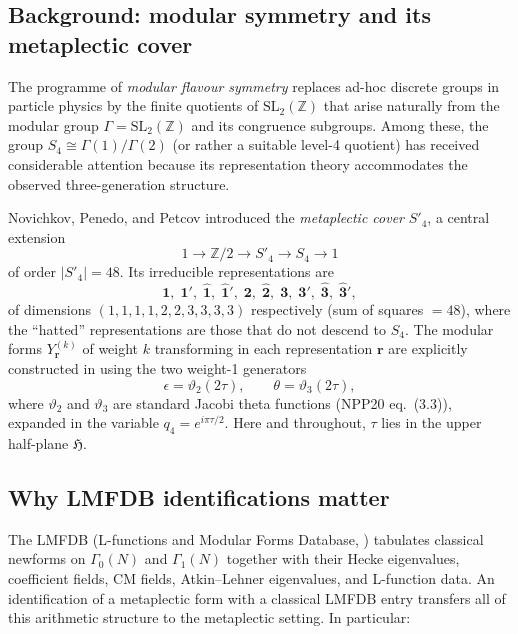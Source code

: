 \documentclass[12pt]{amsart}
\theoremstyle{definition}
\newcommand{\Z}{\mathbb{Z}}
\newcommand{\SL}{\mathrm{SL}}
\newcommand{\Gam}{\Gamma}
\newcommand{\hhat}[1]{\widehat{\mathbf{#1}}}  %
\begin{document}
\subsection{Background: modular symmetry and its metaplectic cover}

The programme of \emph{modular flavour symmetry} replaces ad-hoc discrete
groups in particle physics by the finite quotients of $\SL_2(\Z)$ that
arise naturally from the modular group $\Gamma = \SL_2(\Z)$ and its
congruence subgroups.  Among these, the group $S_4 \cong \Gam(1)/\Gam(2)$
(or rather a suitable level-4 quotient) has received considerable attention
because its representation theory accommodates the observed three-generation
structure.

Novichkov, Penedo, and Petcov \cite{NPP20} introduced the
\emph{metaplectic cover} $S'_4$, a central extension
\[
  1 \to \Z/2 \to S'_4 \to S_4 \to 1
\]
of order $|S'_4| = 48$.  Its irreducible representations are
\[
  \mathbf{1},\; \mathbf{1}',\; \hhat{1},\; \hhat{1}',\;
  \mathbf{2},\; \hhat{2},\; \mathbf{3},\; \mathbf{3}',\; \hhat{3},\;
  \hhat{3}',
\]
of dimensions $(1,1,1,1,2,2,3,3,3,3)$ respectively (sum of squares $= 48$),
where the ``hatted'' representations are those that do not descend
to $S_4$.  The modular forms $Y_{\mathbf{r}}^{(k)}$ of weight $k$
transforming in each representation $\mathbf{r}$ are explicitly
constructed in \cite{NPP20} using the two weight-1 generators
\begin{equation}\label{eq:generators}
  \epsilon = \vartheta_2(2\tau), \qquad \theta = \vartheta_3(2\tau),
\end{equation}
where $\vartheta_2$ and $\vartheta_3$ are standard Jacobi theta functions
(NPP20 eq.~(3.3)), expanded in the variable $q_4 = e^{i\pi\tau/2}$.
Here and throughout, $\tau$ lies in the upper half-plane $\mathfrak{H}$.

\subsection{Why LMFDB identifications matter}

The LMFDB (L-functions and Modular Forms Database, \cite{LMFDB}) tabulates
classical newforms on $\Gam_0(N)$ and $\Gam_1(N)$ together with their
Hecke eigenvalues, coefficient fields, CM fields, Atkin--Lehner eigenvalues,
and L-function data.  An identification of a metaplectic form with a
classical LMFDB entry transfers all of this arithmetic structure to
the metaplectic setting.  In particular:
\end{document}
